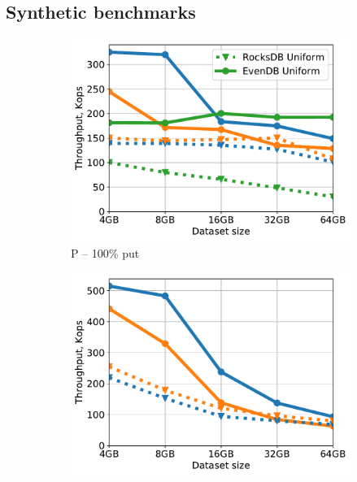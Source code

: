 \subsection{Synthetic benchmarks}
\label{ssec:synthetic} 

\begin{figure}[tb]
\centering
\begin{subfigure}{0.33\linewidth}
\includegraphics[width=\textwidth]{figs/Workload_P_line.pdf}
\caption{P -- 100\% put}
\label{fig:throughput:p}
\end{subfigure}
\begin{subfigure}{0.33\linewidth}
\includegraphics[width=\textwidth]{figs/Workload_A_line.pdf}

\end{subfigure}
\end{figure}

